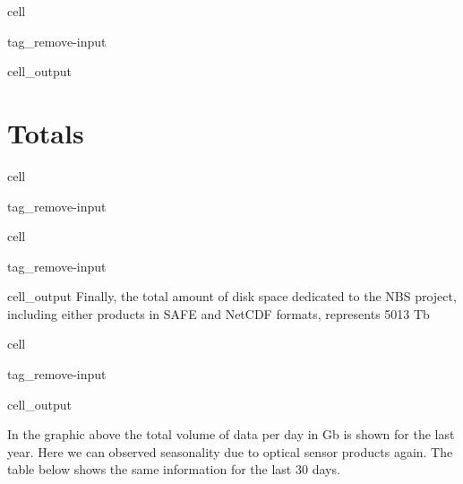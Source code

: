 \documentclass[letterpaper,10pt,english]{jupyterBook}
\begin{document}
\begin{sphinxuseclass}{cell}
\begin{sphinxuseclass}{tag_remove-input}\begin{sphinxVerbatimOutput}

\begin{sphinxuseclass}{cell_output}
\noindent{}

\end{sphinxuseclass}\end{sphinxVerbatimOutput}

\end{sphinxuseclass}
\end{sphinxuseclass}

\section{Totals}
\label{\detokenize{volumes:totals}}
\begin{sphinxuseclass}{cell}
\begin{sphinxuseclass}{tag_remove-input}
\end{sphinxuseclass}
\end{sphinxuseclass}
\begin{sphinxuseclass}{cell}
\begin{sphinxuseclass}{tag_remove-input}\begin{sphinxVerbatimOutput}

\begin{sphinxuseclass}{cell_output}
\sphinxAtStartPar
Finally, the total amount of disk space dedicated to the NBS project, including either products in SAFE and NetCDF formats, represents 5013 Tb

\end{sphinxuseclass}\end{sphinxVerbatimOutput}

\end{sphinxuseclass}
\end{sphinxuseclass}
\begin{sphinxuseclass}{cell}
\begin{sphinxuseclass}{tag_remove-input}\begin{sphinxVerbatimOutput}

\begin{sphinxuseclass}{cell_output}
\noindent{}

\end{sphinxuseclass}\end{sphinxVerbatimOutput}

\end{sphinxuseclass}
\end{sphinxuseclass}
\sphinxAtStartPar
In the graphic above the total volume of data per day in Gb is shown for the last year. Here we can observed seasonality due to optical sensor products again. The table below shows the same information for the last 30 days.
\end{document}
